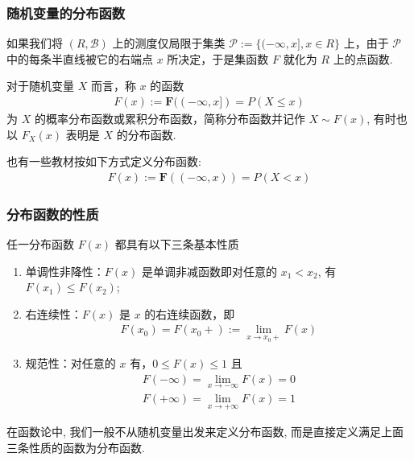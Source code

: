 \documentclass[Prob-All.tex]{subfiles}
\begin{document}
\begin{frame}
	\frametitle{随机变量的分布函数}
	如果我们将 $(R,\mathcal{B})$ 上的测度仅局限于集类 $\mathcal{P}:=\{(-\infty,x],x\in R\}$ 上，由于 $\mathcal{P}$ 中的每条半直线被它的右端点 $x$ 所决定，于是集函数 $F$ 就化为 $R$ 上的点函数.
	\pause
	\begin{defi}
		对于随机变量 $X$ 而言，称 $x$ 的函数
		\begin{eqnarray*}
			F(x):=\mathbf{F}((-\infty,x])=P(X\le x)
		\end{eqnarray*}
		为 $X$ 的概率分布函数或累积分布函数，简称分布函数并记作 $X\sim F (x)$, 有时也以 $F_X (x)$ 表明是 $X$ 的分布函数.
	\end{defi}
	\pause  \begin{rmk}
		也有一些教材按如下方式定义分布函数:
		\begin{eqnarray*}
			F(x):=\mathbf{F}((-\infty,x))=P(X<x)
		\end{eqnarray*}

	\end{rmk}
\end{frame}

\begin{frame}
	\frametitle{分布函数的性质}
	\begin{thm}
		任一分布函数 $F (x)$ 都具有以下三条基本性质
		\begin{enumerate}[<+-|alert@+>]
			\item 单调性非降性：$F (x)$ 是单调非减函数即对任意的 $x_1<x_2$, 有 $F (x_1)\le F (x_2)$;
			\item 右连续性：$F (x)$ 是 $x$ 的右连续函数，即
			      \begin{eqnarray*}
				      F(x_0)=F(x_0+):=\lim_{x\rightarrow x_0+}F(x)
			      \end{eqnarray*}

			\item 规范性：对任意的 $x$ 有，$0\le F (x)\le 1$ 且
			      \begin{eqnarray*}
				      F(-\infty)=\lim_{x\rightarrow-\infty}F(x)=0\\
				      F(+\infty)=\lim_{x\rightarrow +\infty}F(x)=1
			      \end{eqnarray*}
		\end{enumerate}

	\end{thm}
	\pause%
	\begin{rmk}
	在函数论中, 我们一般不从随机变量出发来定义分布函数, 而是直接定义满足上面三条性质的函数为分布函数.
	\end{rmk}

\end{frame}
\end{document}
